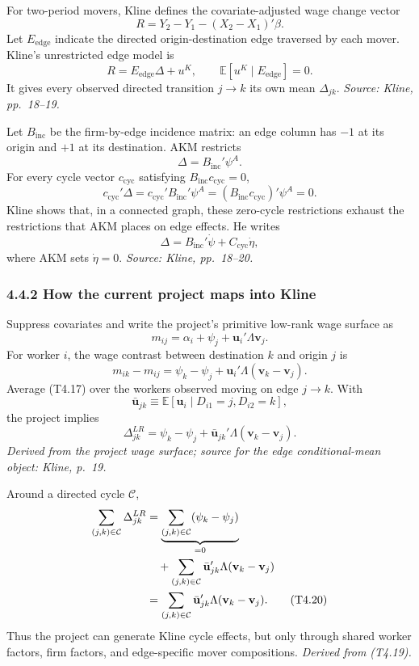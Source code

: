 \documentclass[11pt]{article}
\begin{document}
For two-period movers, Kline defines the covariate-adjusted wage change vector
\[
R
=
Y_2-Y_1-(X_2-X_1)'\beta.
\tag{T4.11}
\]
Let \(E_{\mathrm{edge}}\) indicate the directed origin-destination edge
traversed by each mover.  Kline's unrestricted edge model is
\[
R=E_{\mathrm{edge}}\Delta+u^K,
\qquad
\mathbb E[u^K\mid E_{\mathrm{edge}}]=0.
\tag{T4.12}
\]
It gives every observed directed transition \(j\to k\) its own mean
\(\Delta_{jk}\).
\textit{Source: Kline, pp.\ 18--19.}

Let \(B_{\mathrm{inc}}\) be the firm-by-edge incidence matrix: an edge column
has \(-1\) at its origin and \(+1\) at its destination.  AKM restricts
\[
\Delta=B_{\mathrm{inc}}'\psi^A.
\tag{T4.13}
\]
For every cycle vector \(c_{\mathrm{cyc}}\) satisfying
\(B_{\mathrm{inc}}c_{\mathrm{cyc}}=0\),
\[
c_{\mathrm{cyc}}'\Delta
=
c_{\mathrm{cyc}}'B_{\mathrm{inc}}'\psi^A
=
(B_{\mathrm{inc}}c_{\mathrm{cyc}})'\psi^A
=0.
\tag{T4.14}
\]
Kline shows that, in a connected graph, these zero-cycle restrictions exhaust
the restrictions that AKM places on edge effects.  He writes
\[
\Delta
=
B_{\mathrm{inc}}'\dot\psi
+C_{\mathrm{cyc}}\dot\eta,
\tag{T4.15}
\]
where AKM sets \(\dot\eta=0\).
\textit{Source: Kline, pp.\ 18--20.}

\subsubsection{4.4.2 How the current project maps into Kline}

Suppress covariates and write the project's primitive low-rank wage surface as
\[
m_{ij}
=
\alpha_i+\psi_j+\mathbf u_i'\Lambda\mathbf v_j.
\tag{T4.16}
\]
For worker \(i\), the wage contrast between destination \(k\) and origin \(j\)
is
\[
m_{ik}-m_{ij}
=
\psi_k-\psi_j
+\mathbf u_i'\Lambda(\mathbf v_k-\mathbf v_j).
\tag{T4.17}
\]
Average (T4.17) over the workers observed moving on edge \(j\to k\).  With
\[
\bar{\mathbf u}_{jk}
\equiv
\mathbb E[
\mathbf u_i\mid D_{i1}=j,D_{i2}=k
],
\tag{T4.18}
\]
the project implies
\[
\Delta_{jk}^{LR}
=
\psi_k-\psi_j
+\bar{\mathbf u}_{jk}'\Lambda
(\mathbf v_k-\mathbf v_j).
\tag{T4.19}
\]
\textit{Derived from the project wage surface; source for the edge
conditional-mean object: Kline, p.\ 19.}

Around a directed cycle \(\mathcal C\),
\begin{align}
\sum_{(j,k)\in\mathcal C}\Delta_{jk}^{LR}
&=
\underbrace{
\sum_{(j,k)\in\mathcal C}(\psi_k-\psi_j)
}_{=0}
\notag\\
&\quad+
\sum_{(j,k)\in\mathcal C}
\bar{\mathbf u}_{jk}'\Lambda
(\mathbf v_k-\mathbf v_j) \notag\\
&=
\sum_{(j,k)\in\mathcal C}
\bar{\mathbf u}_{jk}'\Lambda
(\mathbf v_k-\mathbf v_j).
\tag{T4.20}
\end{align}
Thus the project can generate Kline cycle effects, but only through shared
worker factors, firm factors, and edge-specific mover compositions.
\textit{Derived from (T4.19).}
\end{document}
